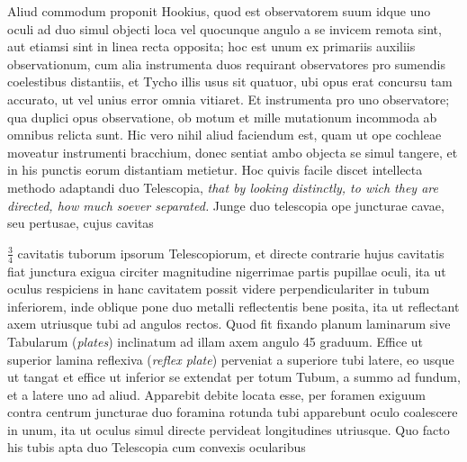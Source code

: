 \pend 
\pstart Aliud commodum proponit Hookius\protect{}, quod est observatorem suum idque uno oculi  ad duo simul objecti loca vel quocunque angulo a se invicem remota sint, aut etiamsi sint in linea recta opposita; hoc est unum ex primariis auxiliis observationum, cum alia instrumenta duos requirant observatores pro sumendis coelestibus distantiis, et Tycho\protect{} illis usus sit quatuor, ubi opus erat concursu tam accurato, ut vel unius error omnia vitiaret. Et instrumenta pro uno observatore; qua duplici opus observatione, ob motum et mille mutationum incommoda ab omnibus relicta sunt. Hic vero nihil aliud faciendum est, quam ut ope cochleae moveatur instrumenti bracchium, donec sentiat ambo objecta se simul tangere, et in his punctis eorum distantiam metietur. Hoc quivis facile discet intellecta methodo adaptandi duo Telescopia\protect{}, \textit{that by looking} 
\pend
\newpage
\pstart \noindent \textit{distinctly, to wich they are directed, how much soever separated.} Junge duo telescopia\protect{} ope juncturae cavae, seu pertusae, cujus cavitas \rule[-4mm]{0mm}{10mm}$\displaystyle\frac{3}{4}$ cavitatis tuborum ipsorum Telescopiorum\protect{}, et directe contrarie hujus cavitatis  fiat junctura exigua circiter magnitudine nigerrimae partis pupillae oculi, ita ut oculus respiciens in hanc cavitatem possit videre perpendiculariter in tubum inferiorem, inde oblique pone duo  metalli reflectentis bene posita, ita ut reflectant axem utriusque tubi ad angulos rectos. Quod fit fixando planum laminarum sive Tabularum (\textit{plates}) inclinatum ad illam axem angulo 45 graduum. Effice ut superior lamina reflexiva (\textit{reflex plate}) perveniat a superiore tubi latere, eo usque ut tangat  et effice ut inferior se extendat per totum Tubum, a summo ad fundum, et a latere uno ad aliud. Apparebit debite locata esse,  per foramen exiguum contra centrum juncturae duo foramina rotunda tubi apparebunt oculo coalescere in unum, ita ut oculus simul directe pervideat longitudines utriusque. Quo facto his tubis apta duo Telescopia\protect{} cum convexis ocularibus\protect{}